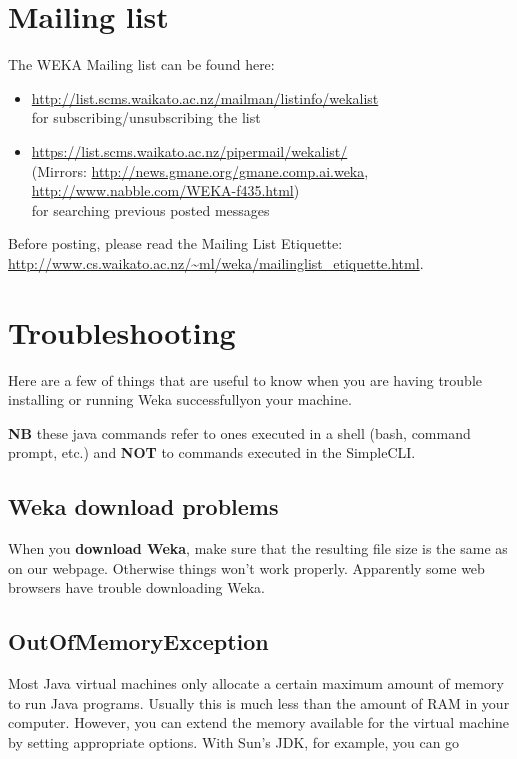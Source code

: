 
\section{Mailing list}
The WEKA Mailing list can be found here:

\begin{itemize}
\item \url{http://list.scms.waikato.ac.nz/mailman/listinfo/wekalist}{}\\
for subscribing/unsubscribing the list
\item \url{https://list.scms.waikato.ac.nz/pipermail/wekalist/}{}\\
(Mirrors: \url{http://news.gmane.org/gmane.comp.ai.weka}{}, \\ \url{http://www.nabble.com/WEKA-f435.html}{}) \\
for searching previous posted messages
\end{itemize}

\noindent Before posting, please read the Mailing List Etiquette:\\
\url{http://www.cs.waikato.ac.nz/~ml/weka/mailinglist_etiquette.html}{}.



\section{Troubleshooting}
Here are a few of things that are useful to know when you are having
trouble installing or running Weka successfullyon your machine.

\textbf{NB} these java commands refer to ones executed in a shell
(bash, command prompt, etc.) and \textbf{NOT} to commands executed in the
SimpleCLI.

\subsection{Weka download problems}
When you \textbf{download Weka}, make sure that the resulting file size is the
same as on our webpage. Otherwise things won't work
properly. Apparently some web browsers have trouble downloading Weka.

\subsection{OutOfMemoryException}
Most Java virtual machines only allocate a certain maximum amount of
memory to run Java programs. Usually this is much less than the amount
of RAM in your computer. However, you can extend the memory available
for the virtual machine by setting appropriate options. With Sun's
JDK, for example, you can go\\

